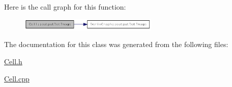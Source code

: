 Here is the call graph for this function:\nopagebreak
\begin{figure}[H]
\begin{center}
\leavevmode
\includegraphics[width=187pt]{classCell_a535ddddc0471fa874a0b22a54bd38c1a_cgraph}
\end{center}
\end{figure}


The documentation for this class was generated from the following files:\begin{DoxyCompactItemize}
\item 
\hyperlink{Cell_8h}{Cell.h}\item 
\hyperlink{Cell_8cpp}{Cell.cpp}\end{DoxyCompactItemize}

